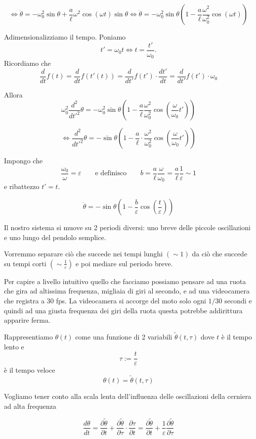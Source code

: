 \[
\Longleftrightarrow
\ddot{\theta}
=
-\omega_0^2\sin\theta
+
\frac{a}{\ell}\omega^2\cos(\omega t)\sin\theta
\Longleftrightarrow
\ddot{\theta}
=
-\omega_0^2\sin\theta
\left(
1-\frac{a}{\ell}\frac{\omega^2}{\omega_0^2}\cos(\omega t)
\right)
\]

Adimensionalizziamo il tempo. Poniamo
\[
t'=\omega_0 t
\Longleftrightarrow
t=\frac{t'}{\omega_0}.
\]
Ricordiamo che
\[
\frac{d}{dt}f(t)
=
\frac{d}{dt}f(t'(t))
=
\frac{d}{dt'}f(t')\cdot \frac{dt'}{dt}
=
\frac{d}{dt'}f(t')\cdot \omega_0
\]

Allora
\[
\omega_0^2\frac{d^2}{dt'^2}\theta
=
-\omega_0^2\sin\theta
\left(
1-\frac{a}{\ell}\frac{\omega^2}{\omega_0^2}
\cos\left(\frac{\omega}{\omega_0}t'\right)
\right)
\]

\[
\Longleftrightarrow
\frac{d^2}{dt'^2}\theta
=
-\sin\theta
\left(
1-\frac{a}{\ell}\cdot \frac{\omega^2}{\omega_0^2}
\cos\left(\frac{\omega}{\omega_0}t'\right)
\right)
\]

Impongo che
\[
\frac{\omega_0}{\omega}=\varepsilon
\qquad \text{e definisco} \qquad
b = \frac{a}{\ell}\frac{\omega}{\omega_0} = \frac{a}{\ell}\frac{1}{\varepsilon} \sim 1
\]
e ribattezzo $t'=t$.

\[
\ddot{\theta}
=
-\sin\theta
\left(
1-\frac{b}{\varepsilon}\cos\left(\frac{t}{\varepsilon}\right)
\right)
\]

Il nostro sistema si muove su 2 periodi diversi: uno breve delle piccole oscillazioni e uno lungo del pendolo semplice.

Vorremmo separare ciò che succede nei tempi lunghi $(\sim 1)$ da ciò che succede su tempi corti $\left(\sim \frac{1}{\varepsilon}\right)$ e poi mediare sul periodo breve.

Per capire a livello intuitivo quello che facciamo possiamo pensare ad una ruota che gira ad altissima frequenza, migliaia di giri al secondo, e ad una videocamera che registra a $30$ fps. La videocamera si accorge del moto solo ogni $1/30$ secondi e quindi ad una giusta frequenza dei giri della ruota questa potrebbe addirittura apparire ferma.

Rappresentiamo $\theta(t)$ come una funzione di 2 variabili $\tilde{\theta}(t,\tau)$ dove $t$ è il tempo lento e
\[
\tau:=\frac{t}{\varepsilon}
\]
è il tempo veloce
\[
\theta(t)=\tilde{\theta}(t,\tau)
\]

Vogliamo tener conto alla scala lenta dell'influenza delle oscillazioni della cerniera ad alta frequenza

\[
\frac{d\theta}{dt}
=
\frac{\partial \tilde{\theta}}{\partial t}
+
\frac{\partial \tilde{\theta}}{\partial \tau}\cdot \frac{\partial \tau}{\partial t}
=
\frac{\partial \tilde{\theta}}{\partial t}
+
\frac{1}{\varepsilon}\frac{\partial \tilde{\theta}}{\partial \tau}
\]

